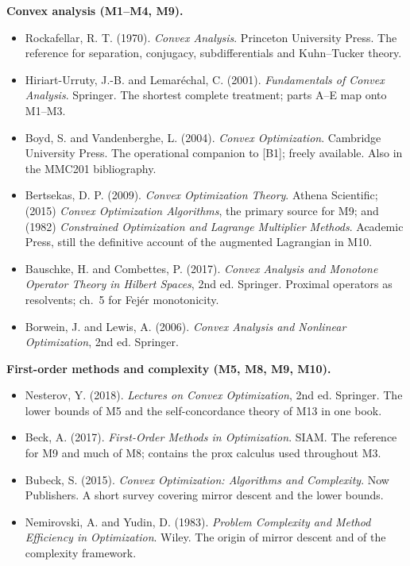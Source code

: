 \documentclass[11pt,a4paper]{article}
\begin{document}
\textbf{Convex analysis (M1--M4, M9).}
\begin{itemize}[label={}]
\item[{[B1]}] Rockafellar, R. T. (1970). \emph{Convex Analysis}. Princeton University Press.
The reference for separation, conjugacy, subdifferentials and Kuhn--Tucker theory.
\item[{[B2]}] Hiriart-Urruty, J.-B. and Lemar\'echal, C. (2001). \emph{Fundamentals of Convex
Analysis}. Springer. The shortest complete treatment; parts A--E map onto M1--M3.
\item[{[B3]}] Boyd, S. and Vandenberghe, L. (2004). \emph{Convex Optimization}. Cambridge
University Press. The operational companion to [B1]; freely available. Also in the MMC201
bibliography.
\item[{[B4]}] Bertsekas, D. P. (2009). \emph{Convex Optimization Theory}. Athena Scientific;
(2015) \emph{Convex Optimization Algorithms}, the primary source for M9; and (1982)
\emph{Constrained Optimization and Lagrange Multiplier Methods}. Academic Press, still the
definitive account of the augmented Lagrangian in M10.
\item[{[B5]}] Bauschke, H. and Combettes, P. (2017). \emph{Convex Analysis and Monotone
Operator Theory in Hilbert Spaces}, 2nd ed. Springer. Proximal operators as resolvents; ch.~5
for Fej\'er monotonicity.
\item[{[B6]}] Borwein, J. and Lewis, A. (2006). \emph{Convex Analysis and Nonlinear
Optimization}, 2nd ed. Springer.
\end{itemize}

\textbf{First-order methods and complexity (M5, M8, M9, M10).}
\begin{itemize}[label={}]
\item[{[B7]}] Nesterov, Y. (2018). \emph{Lectures on Convex Optimization}, 2nd ed. Springer.
The lower bounds of M5 and the self-concordance theory of M13 in one book.
\item[{[B8]}] Beck, A. (2017). \emph{First-Order Methods in Optimization}. SIAM. The reference
for M9 and much of M8; contains the prox calculus used throughout M3.
\item[{[B9]}] Bubeck, S. (2015). \emph{Convex Optimization: Algorithms and Complexity}. Now
Publishers. A short survey covering mirror descent and the lower bounds.
\item[{[B10]}] Nemirovski, A. and Yudin, D. (1983). \emph{Problem Complexity and Method
Efficiency in Optimization}. Wiley. The origin of mirror descent and of the complexity
framework.
\end{itemize}
\end{document}
